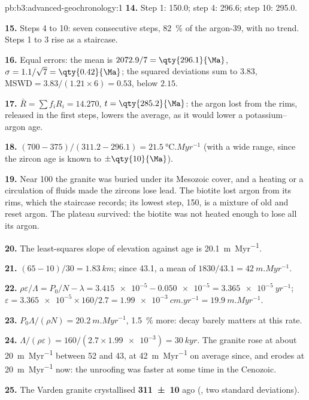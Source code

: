 \begin{solution}{pb:b3:advanced-geochronology:1}
\textbf{14.} Step 1: \qty{150.0}{\Ma}; step 4: \qty{296.6}{\Ma}; step 10:
\qty{295.0}{\Ma}.

\textbf{15.} Steps 4 to 10: seven consecutive steps, \qty{82}{\percent} of the
argon-39, with no trend. Steps 1 to 3 rise as a staircase.

\textbf{16.} Equal errors: the mean is $2072.9/7 = \qty{296.1}{\Ma}$, $\sigma =
1.1/\sqrt7 = \qty{0.42}{\Ma}$; the squared deviations sum to $3.83$,
$\mathrm{MSWD} = 3.83/(1.21\times6) = 0.53$, below $2.15$.

\textbf{17.} $\bar R = \sum f_iR_i = 14.270$, $t = \qty{285.2}{\Ma}$: the
argon lost from the rims, released in the first steps, lowers the average, as
it would lower a potassium--argon age.

\textbf{18.} $(700 - 375)/(311.2 - 296.1) = \qty{21.5}{\celsius.Myr^{-1}}$
(with a wide range, since the zircon age is known to $\pm\qty{10}{\Ma}$).

\textbf{19.} Near \qty{100}{\Ma} the granite was buried under its Mesozoic
cover, and a heating or a circulation of fluids made the zircons lose lead.
The biotite lost argon from its rims, which the staircase records; its
lowest step, \qty{150}{\Ma}, is a mixture of old and reset argon. The plateau
survived: the biotite was not heated enough to lose all its argon.

\textbf{20.} The least-squares slope of elevation against age is
\qty{20.1}{m.Myr^{-1}}.

\textbf{21.} $(65 - 10)/30 = \qty{1.83}{km}$; since \qty{43.1}{\Ma}, a mean of
$1830/43.1 = \qty{42}{m.Myr^{-1}}$.

\textbf{22.} $\rho\varepsilon/\Lambda = P_0/N - \lambda = \num{3.415e-5} -
\num{0.050e-5} = \qty{3.365e-5}{yr^{-1}}$; $\varepsilon = \num{3.365e-5}\times
160/2.7 = \qty{1.99e-3}{cm.yr^{-1}} = \qty{19.9}{m.Myr^{-1}}$.

\textbf{23.} $P_0\Lambda/(\rho N) = \qty{20.2}{m.Myr^{-1}}$, \qty{1.5}{\percent}
more: decay barely matters at this rate.

\textbf{24.} $\Lambda/(\rho\varepsilon) = 160/(2.7\times\num{1.99e-3}) =
\qty{30}{kyr}$. The granite rose at about \qty{20}{m.Myr^{-1}} between 52 and
\qty{43}{\Ma}, at \qty{42}{m.Myr^{-1}} on average since, and erodes at
\qty{20}{m.Myr^{-1}} now: the unroofing was faster at some time in the
Cenozoic.

\textbf{25.} The Varden granite crystallised
\textbf{\qty[text-series-to-math=true, separate-uncertainty=true]{311 \pm 10}{\Ma}} ago (,
two standard deviations).
\end{solution}
